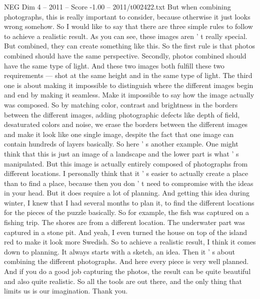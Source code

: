 \begin{textsample}{NEG Dim 4 – 2011 – Score -1.00 – 2011/t002422.txt}
But when combining photographs, this is really important to consider, because otherwise it just looks wrong somehow.
So I would like to say that there are three simple rules to follow to achieve a realistic result.
As you can see, these images aren ' t really special.
But combined, they can create something like this.
So the first rule is that photos combined should have the same perspective.
Secondly, photos combined should have the same type of light.
And these two images both fulfill these two requirements — shot at the same height and in the same type of light.
The third one is about making it impossible to distinguish where the different images begin and end by making it seamless.
Make it impossible to say how the image actually was composed.
So by matching color, contrast and brightness in the borders between the different images, adding photographic defects like depth of field, desaturated colors and noise, we erase the borders between the different images and make it look like one single image, despite the fact that one image can contain hundreds of layers basically.
So here ' s another example.
One might think that this is just an image of a landscape and the lower part is what ' s manipulated.
But this image is actually entirely composed of photographs from different locations.
I personally think that it ' s easier to actually create a place than to find a place, because then you don ' t need to compromise with the ideas in your head.
But it does require a lot of planning.
And getting this idea during winter, I knew that I had several months to plan it, to find the different locations for the pieces of the puzzle basically.
So for example, the fish was captured on a fishing trip.
The shores are from a different location.
The underwater part was captured in a stone pit.
And yeah, I even turned the house on top of the island red to make it look more Swedish.
So to achieve a realistic result, I think it comes down to planning.
It always starts with a sketch, an idea.
Then it ' s about combining the different photographs.
And here every piece is very well planned.
And if you do a good job capturing the photos, the result can be quite beautiful and also quite realistic.
So all the tools are out there, and the only thing that limits us is our imagination.
Thank you.

\end{textsample}
